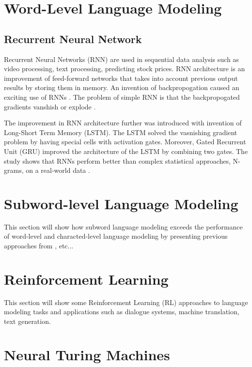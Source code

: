 \documentclass{IEEEtran}
\begin{document}
\section{Word-Level Language Modeling}

\subsection{Recurrent Neural Network}

Recurrent Neural Networks (RNN) are used in sequential data analysis such as video processing, text processing, predicting stock prices. RNN architecture is an improvement of feed-forward networks that takes into account previous output results by storing them in memory. An invention of backpropogation caused an exciting use of RNNs \cite{deeplearning}. The problem of simple RNN is that the backpropogated gradients vanshish or explode \cite{rnn}.

The improvement in RNN architecture further was introduced with invention of Long-Short Term Memory (LSTM). The LSTM solved the vasnishing gradient problem by having special cells with activation gates. Moreover, Gated Recurrent Unit (GRU) improved the architecture of the LSTM by combining two gates. The study shows that RNNs perform better than complex statistical approaches, N-grams, on a real-world data \cite{rnn}.

\section{Subword-level Language Modeling}

This section will show how subword language modeling exceeds the performance of word-level and characted-level language modeling by presenting previous approaches from \cite{Mikolov2011SubwordLM}, etc...

\section{Reinforcement Learning}

This section will show some Reinforcement Learning (RL) approaches to language modeling tasks and applications such as dialogue systems, machine translation, text generation.

\section{Neural Turing Machines}
\end{document}

